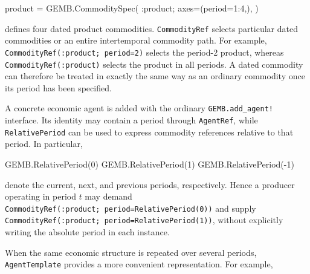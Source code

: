 \documentclass[
  letterpaper,
  DIV=11,
  numbers=noendperiod]{scrreprt}
\newenvironment{Shaded}{\begin{snugshade}}{\end{snugshade}}
\newcommand{\FloatTok}[1]{\textcolor[rgb]{0.68,0.00,0.00}{#1}}
\newcommand{\FunctionTok}[1]{\textcolor[rgb]{0.28,0.35,0.67}{#1}}
\newcommand{\NormalTok}[1]{\textcolor[rgb]{0.00,0.23,0.31}{#1}}
\newcommand{\OperatorTok}[1]{\textcolor[rgb]{0.37,0.37,0.37}{#1}}
\begin{document}
\begin{Shaded}
\begin{Highlighting}[]
\NormalTok{product }\OperatorTok{=}\NormalTok{ GEMB.}\FunctionTok{CommoditySpec}\NormalTok{(}
    \OperatorTok{:}\NormalTok{product;}
\NormalTok{    axes}\OperatorTok{=}\NormalTok{(period}\OperatorTok{=}\FloatTok{1}\OperatorTok{:}\FloatTok{4}\NormalTok{,),}
\NormalTok{)}
\end{Highlighting}
\end{Shaded}

defines four dated product commodities. \texttt{CommodityRef} selects
particular dated commodities or an entire intertemporal commodity path.
For example, \texttt{CommodityRef(:product;\ period=2)} selects the
period-2 product, whereas \texttt{CommodityRef(:product)} selects the
product in all periods. A dated commodity can therefore be treated in
exactly the same way as an ordinary commodity once its period has been
specified.

A concrete economic agent is added with the ordinary
\texttt{GEMB.add\_agent!} interface. Its identity may contain a period
through \texttt{AgentRef}, while \texttt{RelativePeriod} can be used to
express commodity references relative to that period. In particular,

\begin{Shaded}
\begin{Highlighting}[]
\NormalTok{GEMB.}\FunctionTok{RelativePeriod}\NormalTok{(}\FloatTok{0}\NormalTok{)}
\NormalTok{GEMB.}\FunctionTok{RelativePeriod}\NormalTok{(}\FloatTok{1}\NormalTok{)}
\NormalTok{GEMB.}\FunctionTok{RelativePeriod}\NormalTok{(}\OperatorTok{{-}}\FloatTok{1}\NormalTok{)}
\end{Highlighting}
\end{Shaded}

denote the current, next, and previous periods, respectively. Hence a
producer operating in period \(t\) may demand
\texttt{CommodityRef(:product;\ period=RelativePeriod(0))} and supply
\texttt{CommodityRef(:product;\ period=RelativePeriod(1))}, without
explicitly writing the absolute period in each instance.

When the same economic structure is repeated over several periods,
\texttt{AgentTemplate} provides a more convenient representation. For
example,
\end{document}
